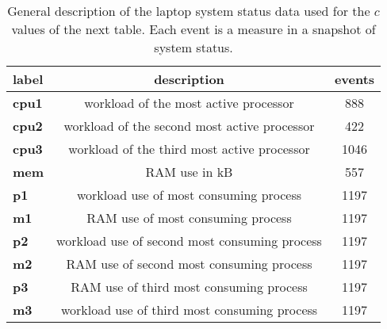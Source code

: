 \begin{table}[h!]
\begin{center}
\begin{tabular}{| l || c | c |}\hline
label & description & events \\\hline\hline
{\bf cpu1} & workload of the most active processor & 888 \\\hline
{\bf cpu2} & workload of the second most active processor & 422 \\\hline
{\bf cpu3} & workload of the third most active processor & 1046 \\\hline\hline
{\bf mem} & RAM use in kB & 557 \\\hline\hline
{\bf p1} & workload use of most consuming process & 1197 \\\hline
{\bf m1} & RAM use of most consuming process & 1197 \\\hline\hline
{\bf p2} & workload use of second most consuming process & 1197 \\\hline
{\bf m2} & RAM use of second most consuming process & 1197 \\\hline\hline
{\bf p3} & RAM use of third most consuming process & 1197 \\\hline
{\bf m3} & workload use of third most consuming process & 1197 \\\hline
\end{tabular}
\caption{General description of the laptop system status data used for the $c$ values of the next table. Each event is a measure in a snapshot of system status.}
\end{center}
\end{table}
